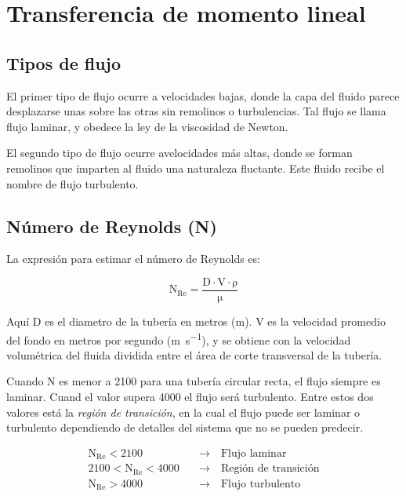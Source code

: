 \documentclass{AsignaturaResumen}
\begin{document}
    \chapter{Transferencia de momento lineal}
\fi


\section{Tipos de flujo}

El primer tipo de flujo ocurre a velocidades bajas, donde la capa del fluido parece desplazarse unas sobre las otras sin remolinos o turbulencias. Tal flujo se llama flujo laminar, y obedece la ley de la viscosidad de Newton.

El segundo tipo de flujo ocurre avelocidades más altas, donde se forman remolinos que imparten al fluido una naturaleza fluctante. Este fluido recibe el nombre de flujo turbulento. 

\section{Número de Reynolds (N)}

La expresión para estimar el número de Reynolds es:

\begin{equation}\label{eq:numero_de_reynolds}
\mathrm{ N_{Re} = \frac{D \cdot V \cdot \rho}{\mu} }\end{equation}

Aquí D es el diametro de la tubería en metros (\unit{\m}). V es la velocidad promedio del fondo en metros por segundo (\unit{\m\per\s}), y se obtiene con la velocidad volumétrica del fluida dividida entre el área de corte transversal de la tubería.

Cuando N es menor a 2100 para una tubería circular recta, el flujo siempre es laminar. Cuand el valor supera 4000 el flujo será turbulento. Entre estos dos valores está la \emph{región de transición}, en la cual el flujo puede ser laminar o turbulento dependiendo de detalles del sistema que no se pueden predecir.

\begin{align*}
    \mathrm{N_{Re}} < 2100        &\quad\longrightarrow\quad \text{Flujo laminar}
    \\
    2100 < \mathrm{N_{Re}} < 4000 &\quad\longrightarrow\quad \text{Región de transición}
    \\
    \mathrm{N_{Re}} > 4000        &\quad\longrightarrow\quad \text{Flujo turbulento}
\end{align*}
\end{document}
